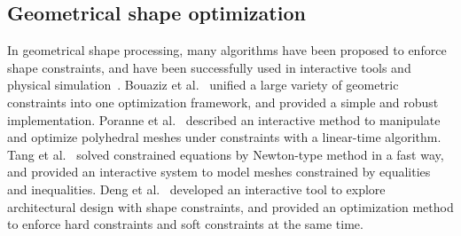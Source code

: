 \subsection{Geometrical shape optimization}
In geometrical shape processing, many algorithms have been proposed to enforce shape constraints, and have been successfully used in interactive tools and physical simulation~\cite{Botsch:2006:PCP:1281957.1281959,Igarashi:2005:ASM:1186822.1073323}. 
Bouaziz et al.~\cite{Bouaziz:2012:SSD:2346796.2346802} unified a large variety of geometric constraints into one optimization framework, and provided a simple and robust implementation. 
Poranne et al.~\cite{Poranne2013Interactive} described an interactive method to manipulate and optimize polyhedral meshes under constraints with a linear-time algorithm. 
%
Tang et al.~\cite{Tang:2014:FPM:2601097.2601213} solved constrained equations by Newton-type method in a fast way, and provided an interactive system to model meshes constrained by equalities and inequalities. 
Deng et al.~\cite{Deng2015} developed an interactive tool to explore architectural design with shape constraints, and provided an optimization method to enforce hard constraints and soft constraints at the same time. 




